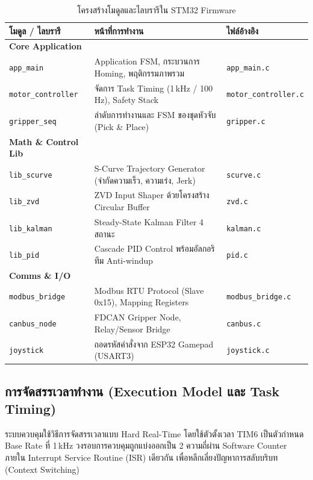 \begin{table}[H]
  \centering
  \caption{โครงสร้างโมดูลและไลบรารีใน STM32 Firmware}
  \label{tab:firmware_modules}
  \small
  \begin{tabular}{>{\raggedright\arraybackslash}p{3.5cm} >{\raggedright\arraybackslash}p{6.5cm} >{\raggedright\arraybackslash}p{3.5cm}}
    \toprule
    โมดูล / ไลบรารี & หน้าที่การทำงาน & ไฟล์อ้างอิง \\
    \midrule
    \textbf{Core Application} & & \\
    \texttt{app\_main} & Application FSM, กระบวนการ Homing, พฤติกรรมภาพรวม & \texttt{app\_main.c} \\
    \texttt{motor\_controller} & จัดการ Task Timing (1\,kHz / 100\,Hz), Safety Stack & \texttt{motor\_controller.c} \\
    \texttt{gripper\_seq} & ลำดับการทำงานและ FSM ของชุดหัวจับ (Pick \& Place) & \texttt{gripper.c} \\
    \midrule
    \textbf{Math \& Control Lib} & & \\
    \texttt{lib\_scurve} & S-Curve Trajectory Generator (จำกัดความเร็ว, ความเร่ง, Jerk) & \texttt{scurve.c} \\
    \texttt{lib\_zvd} & ZVD Input Shaper ด้วยโครงสร้าง Circular Buffer & \texttt{zvd.c} \\
    \texttt{lib\_kalman} & Steady-State Kalman Filter 4 สถานะ & \texttt{kalman.c} \\
    \texttt{lib\_pid} & Cascade PID Control พร้อมอัลกอริทึม Anti-windup & \texttt{pid.c} \\
    \midrule
    \textbf{Comms \& I/O} & & \\
    \texttt{modbus\_bridge} & Modbus RTU Protocol (Slave 0x15), Mapping Registers & \texttt{modbus\_bridge.c} \\
    \texttt{canbus\_node} & FDCAN Gripper Node, Relay/Sensor Bridge & \texttt{canbus.c} \\
    \texttt{joystick} & ถอดรหัสคำสั่งจาก ESP32 Gamepad (USART3) & \texttt{joystick.c} \\
    \bottomrule
  \end{tabular}
\end{table}

\subsection{การจัดสรรเวลาทำงาน (Execution Model และ Task Timing)}
\label{subsec:execution_model}

ระบบควบคุมใช้วิธีการจัดสรรเวลาแบบ Hard Real-Time โดยใช้ตัวตั้งเวลา TIM6 เป็นตัวกำหนด Base Rate ที่ 1\,kHz วงรอบการควบคุมถูกแบ่งออกเป็น 2 ความถี่ผ่าน Software Counter ภายใน Interrupt Service Routine (ISR) เดียวกัน เพื่อหลีกเลี่ยงปัญหาการสลับบริบท (Context Switching)

